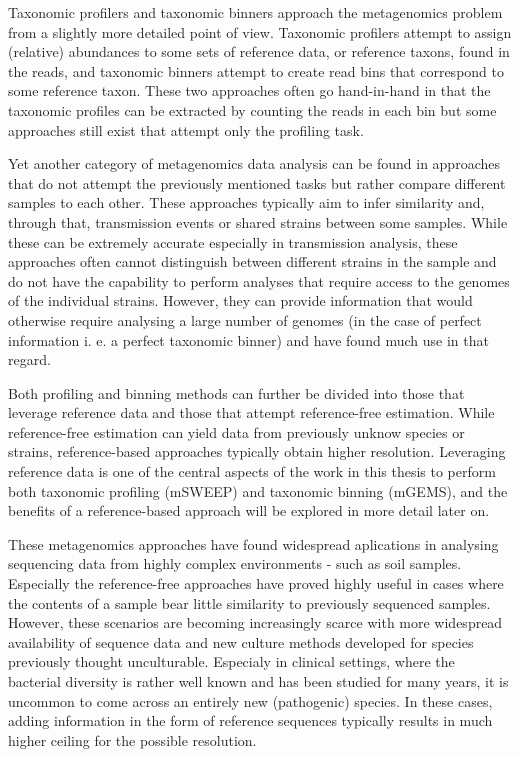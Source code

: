 \documentclass[officiallayout]{tktla}
\begin{document}
Taxonomic profilers and taxonomic binners approach the metagenomics
problem from a slightly more detailed point of view. Taxonomic
profilers attempt to assign (relative) abundances to some sets of
reference data, or reference taxons, found in the reads, and taxonomic
binners attempt to create read bins that correspond to some reference
taxon. These two approaches often go hand-in-hand in that the
taxonomic profiles can be extracted by counting the reads in each bin
but some approaches still exist that attempt only the profiling
task.

Yet another category of metagenomics data analysis can be found in
approaches that do not attempt the previously mentioned tasks but
rather compare different samples to each other. These approaches
typically aim to infer similarity and, through that, transmission
events or shared strains between some samples. While these can be
extremely accurate especially in transmission analysis, these
approaches often cannot distinguish between different strains in the
sample and do not have the capability to perform analyses that require
access to the genomes of the individual strains. However, they can
provide information that would otherwise require analysing a large
number of genomes (in the case of perfect information i. e. a perfect
taxonomic binner) and have found much use in that regard.

Both profiling and binning methods can further be divided into
those that leverage reference data and those that attempt
reference-free estimation. While reference-free estimation can yield
data from previously unknow species or strains, reference-based
approaches typically obtain higher resolution. Leveraging reference
data is one of the central aspects of the work in this thesis to
perform both taxonomic profiling (mSWEEP) and taxonomic binning
(mGEMS), and the benefits of a reference-based approach will be
explored in more detail later on.

These metagenomics approaches have found widespread aplications in
analysing sequencing data from highly complex environments - such as
soil samples. Especially the reference-free approaches have proved
highly useful in cases where the contents of a sample bear little
similarity to previously sequenced samples. However, these scenarios
are becoming increasingly scarce with more widespread availability of
sequence data and new culture methods developed for species previously
thought unculturable. Especialy in clinical settings, where the
bacterial diversity is rather well known and has been studied for many
years, it is uncommon to come across an entirely new (pathogenic)
species. In these cases, adding information in the form of reference
sequences typically results in much higher ceiling for the possible
resolution.
\end{document}
